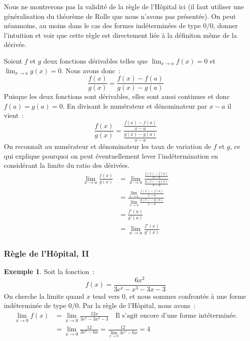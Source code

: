 \documentclass[10pt,notheorems]{beamer}
\theoremstyle{plain}
\theoremstyle{definition} %
\newtheorem{example}{Exemple}
\begin{document}
\begin{notes}
  Nous ne montrerons pas la validité de la règle de l'Hôpital ici (il faut utiliser une généralisation du théorème de Rolle que nous n'avons pas présentée). On peut néanmoins, au moins dans le cas des formes indéterminées de type $0/0$, donner l'intuition et voir que cette règle est directement liée à la définiton même de la dérivée.\newline

  Soient $f$ et $g$ deux fonctions dérivables telles que $\lim_{x\rightarrow a}f(x) = 0$ et $\lim_{x\rightarrow a}g(x) = 0$. Nous avons donc~:
  \[
    \frac{f(x)}{g(x)} = \frac{f(x)-f(a)}{g(x)-g(a)}
  \]
  Puisque les deux fonctions sont dérivables, elles sont aussi continues et donc $f(a)=g(a)=0$. En divisant le numérateur et dénominateur par $x-a$ il vient~:
  \[
    \frac{f(x)}{g(x)} = \frac{\frac{f(x)-f(a)}{x-a}}{\frac{g(x)-g(a)}{x-a}}
  \]
  On reconnaît au numérateur et dénominateur les taux de variation de $f$ et $g$, ce qui explique pourquoi on peut éventuellement lever l'indétermination en considérant la limite du ratio des dérivées.
  \[
    \begin{split}
      \lim_{x\rightarrow a}\frac{f(x)}{g(x)} &= \lim_{x\rightarrow a}\frac{\frac{f(x)-f(a)}{x-a}}{\frac{g(x)-g(a)}{x-a}}\\
      &= \frac{\lim_{x\rightarrow a}\frac{f(x)-f(a)}{x-a}}{\lim_{x\rightarrow a}\frac{g(x)-g(a)}{x-a}}\\
      &= \frac{f'(a)}{g'(a)}\\
      &= \lim_{x\rightarrow a}\frac{f'(x)}{g'(x)}
    \end{split}
  \]

\end{notes}


\begin{frame}
  \frametitle{Règle de l'Hôpital, II}

  \begin{example}
    Soit la fonction~:
    \[
      f(x) = \frac{6x^2}{3e^x-x^3-3x-3}
    \]
    On cherche la limite quand $x$ tend vers 0, et nous sommes
    confrontés à une forme indéterminée de type $0/0$. Par la règle de l'Hôpital, nous avons~:
    \[
      \begin{split}
        \lim_{x\rightarrow 0} f(x) &= \lim_{x\rightarrow 0} \frac{12x}{3e^x-3x^2-3} \quad \text{Il s'agit encore d'une forme intéterminée.}\\
        &= \lim_{x\rightarrow 0} \frac{12}{3e^x-6x} = \frac{12}{\lim_{x\rightarrow 0} 3e^x-6x} = 4
      \end{split}
    \]
  \end{example}

\end{frame}
\end{document}
